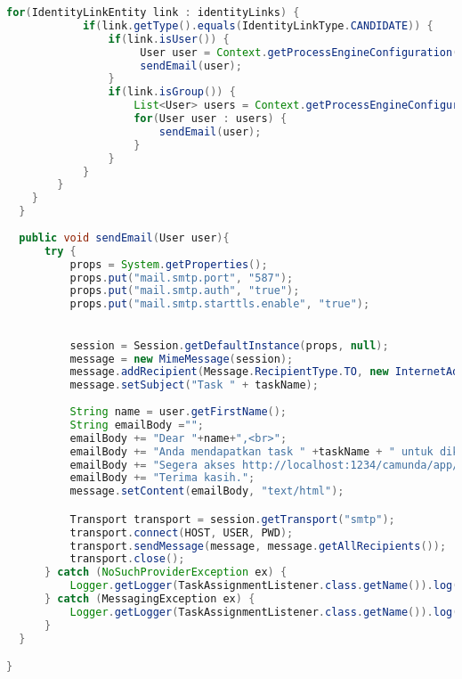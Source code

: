 \begin{lstlisting}[language=Java,basicstyle=\tiny,caption=TaskAssignmentListener.java]
    	for(IdentityLinkEntity link : identityLinks) {
    		if(link.getType().equals(IdentityLinkType.CANDIDATE)) {
    		    if(link.isUser()) {
	    		     User user = Context.getProcessEngineConfiguration().getIdentityService().createUserQuery().userId(link.getUserId()).singleResult();
	    		     sendEmail(user);
    		    }
    		    if(link.isGroup()) {
    		        List<User> users = Context.getProcessEngineConfiguration().getIdentityService().createUserQuery().memberOfGroup(link.getGroupId()).list();
    		        for(User user : users) {
    		        	sendEmail(user);
    		        }
    		    }
    		}
    	}
    }
  }
  
  public void sendEmail(User user){
      try {
          props = System.getProperties();
          props.put("mail.smtp.port", "587");
          props.put("mail.smtp.auth", "true");
          props.put("mail.smtp.starttls.enable", "true");

          
          session = Session.getDefaultInstance(props, null);
          message = new MimeMessage(session);
          message.addRecipient(Message.RecipientType.TO, new InternetAddress(user.getEmail()));
          message.setSubject("Task " + taskName);
          
          String name = user.getFirstName();
          String emailBody ="";
          emailBody += "Dear "+name+",<br>";
          emailBody += "Anda mendapatkan task " +taskName + " untuk dikerjakan.<br>";
          emailBody += "Segera akses http://localhost:1234/camunda/app/tasklist/default/#/?task="+taskId +" untuk menjalankannya.<br>";
          emailBody += "Terima kasih.";
          message.setContent(emailBody, "text/html");

          Transport transport = session.getTransport("smtp");            
          transport.connect(HOST, USER, PWD);
          transport.sendMessage(message, message.getAllRecipients());
          transport.close();
      } catch (NoSuchProviderException ex) {
          Logger.getLogger(TaskAssignmentListener.class.getName()).log(Level.SEVERE, null, ex);
      } catch (MessagingException ex) {
          Logger.getLogger(TaskAssignmentListener.class.getName()).log(Level.SEVERE, null, ex);
      }
  }

}


\end{lstlisting}
